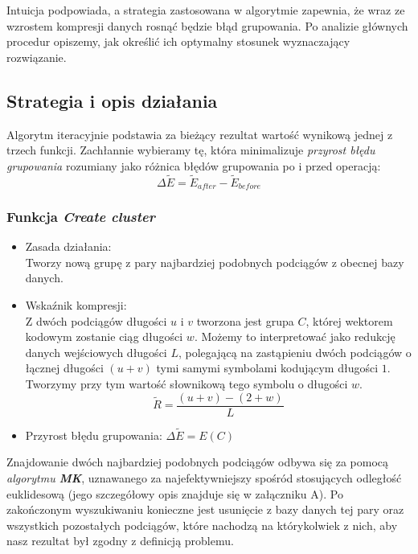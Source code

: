 \documentclass{article}
\theoremstyle{definition}
\begin{document}
Intuicja podpowiada, a strategia zastosowana w algorytmie zapewnia, że wraz ze wzrostem kompresji danych rosnąć będzie błąd grupowania.
Po analizie głównych procedur opiszemy, jak określić ich optymalny stosunek wyznaczający rozwiązanie.


\subsection{Strategia i opis działania}
Algorytm iteracyjnie podstawia za bieżący rezultat wartość wynikową jednej z trzech funkcji.
Zachłannie wybieramy tę, która minimalizuje \textit{przyrost błędu grupowania} rozumiany jako różnica błędów grupowania po i przed operacją: $$\Delta \tilde{E} = \tilde{E}_{after} - \tilde{E}_{before} $$



\subsubsection{Funkcja \textit{Create cluster}}

\begin{itemize}

\item Zasada działania: \\Tworzy nową grupę z pary najbardziej podobnych podciągów z obecnej bazy danych. 

\item Wskaźnik kompresji: \\
Z dwóch podciągów długości $u$ i $v$ tworzona jest grupa $C$, której wektorem kodowym zostanie ciąg długości $w$.
Możemy to interpretować jako redukcję danych wejściowych długości $L$, polegającą na zastąpieniu dwóch podciągów o łącznej
długości $(u+v)$ tymi samymi symbolami kodującym długości $1$. Tworzymy przy tym wartość słownikową tego symbolu o długości $w$. \\
        $$\tilde{R} = \frac{(u+v) - (2 + w)}{L}$$
\item Przyrost błędu grupowania: $\Delta \tilde{E} = E(C)$

\end{itemize}

Znajdowanie dwóch najbardziej podobnych podciągów odbywa się za pomocą \textit{algorytmu \textbf{MK}},
uznawanego za najefektywniejszy spośród stosujących odległość euklidesową (jego szczegółowy opis znajduje się w załączniku A).
Po zakończonym wyszukiwaniu konieczne jest usunięcie z bazy danych tej pary oraz wszystkich pozostałych podciągów, które nachodzą na którykolwiek z nich, aby nasz rezultat był zgodny z definicją problemu.
\end{document}
